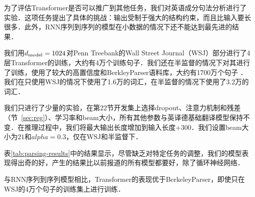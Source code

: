 为了评估Transformer是否可以推广到其他任务，我们对英语成分句法分析进行了实验．这项任务提出了具体的挑战：输出受制于强大的结构约束，而且比输入要长很多．此外，RNN序列到序列的模型在小数据的情况下还不能达到最先进的结果\cite{KVparse15}．


我们用$d_{\text{model}}=1024$对Penn Treebank的Wall Street Journal（WSJ）部分进行了4层Transformer的训练，大约有4万个训练句子．我们还在半监督的情况下对其进行了训练，使用了较大的高置信度和BerkleyParser语料库，大约有1700万个句子  \citep{KVparse15}．我们在只使用WSJ的情况下使用了1.6万的词汇，在半监督的情况下使用了3.2万的词汇．


我们只进行了少量的实验，在第22节开发集上选择dropout、注意力机制和残差（节~\ref{sec:reg}）、学习率和beam大小，所有其他参数与英译德基础翻译模型保持不变．在推理过程中，我们将最大输出长度增加到输入长度+$300$．我们设置beam大小为$21$和$alpha=0.3$，仅在WSJ和半监督下．


表\ref{tab:parsing-results}中的结果显示，尽管缺乏对特定任务的调整，我们的模型表现得出奇的好，产生的结果比以前报道的所有模型都要好，除了循环神经网络\cite{dyer-rnng:16}．



与RNN序列到序列模型\citep{KVparse15}相比，Transformer的表现优于BerkeleyParser\cite{petrov-EtAl:2006:ACL}，即使只在WSJ的4万个句子的训练集上进行训练．
